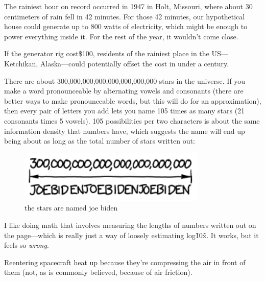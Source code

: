 {The rainiest hour on record occurred in 1947 in Holt, Missouri, where about 30 centimeters of rain fell in 42 minutes. For those 42 minutes, our hypothetical house could generate up to 800 watts of electricity, which might be enough to power everything inside it. For the rest of the year, it wouldn’t come close.}

{If the generator rig cost\$100, residents of the rainiest place in the US—Ketchikan, Alaska—could potentially offset the cost in under a century.}


\hfill{}

{There are about 300,000,000,000,000,000,000,000 stars in the universe. If you make a word pronounceable by alternating vowels and consonants (there are better ways to make pronounceable words, but this will do for an approximation), then every pair of letters you add lets you name 105 times as many stars (21 consonants times 5 vowels). 105 possibilities per two characters is about the same information density that numbers have, which suggests the name will end up being about as long as the total number of stars written out:}

\begin{figure}[!htbp]
\centering
\includegraphics[scale=0.5, max width=0.8\textwidth]{imgs/a/23/short_stars.png}
\caption{the stars are named joe biden}
\end{figure}

{I like doing math that involves measuring the lengths of numbers written out on the page—which is really just a way of loosely estimating log\~10\~x. It works, but it feels so \emph{wrong}.}


\hfill{}

{Reentering spacecraft heat up because they’re compressing the air in front of them (not, as is commonly believed, because of air friction).}

